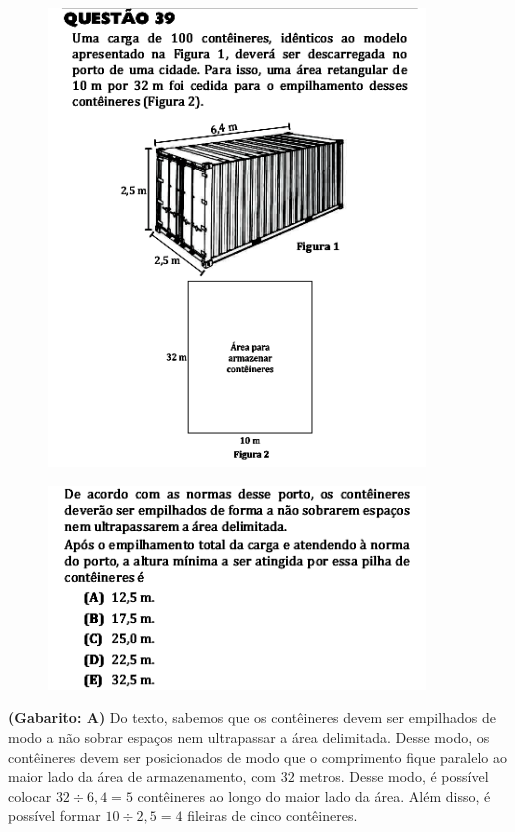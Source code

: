 \documentclass[a4paper]{article}
\begin{document}
\begin{figure}[H]
	\begin{center}
		\includegraphics[width=10cm]{L2Q39_1.png}
	\end{center}
\end{figure}
\begin{figure}[H]
	\begin{center}
		\includegraphics[width=10cm]{L2Q39_2.png}
	\end{center}
\end{figure}
\par\textbf{(Gabarito: A)} Do texto, sabemos que os contêineres devem ser empilhados de modo a não sobrar espaços nem ultrapassar a área delimitada. Desse modo, os contêineres devem ser posicionados de modo que o comprimento fique paralelo ao maior lado da área de armazenamento, com $32$ metros. Desse modo, é possível colocar $32\div 6,4 = 5$ contêineres ao longo do maior lado da área. Além disso, é possível formar $10\div 2,5 = 4$ fileiras de cinco contêineres.
\end{document}
